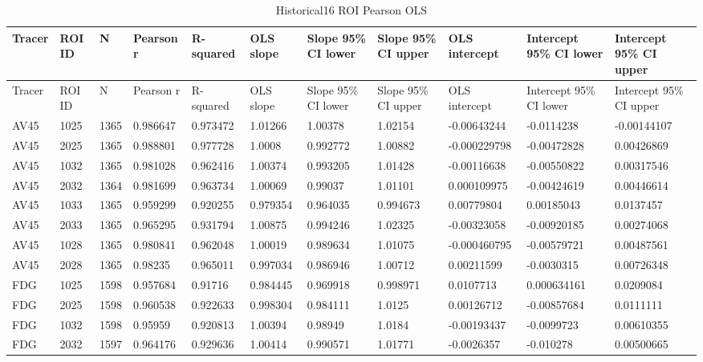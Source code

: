 \begin{landscape}
\begingroup
\footnotesize
\setlength{\tabcolsep}{4pt}
\begin{longtable}{lllllllllll}
\caption{Historical16 ROI Pearson OLS}\label{tab:s-n09}\\
\toprule
Tracer & ROI ID & N & Pearson r & R-squared & OLS slope & Slope 95\% CI lower & Slope 95\% CI upper & OLS intercept & Intercept 95\% CI lower & Intercept 95\% CI upper \\
\midrule
\endfirsthead
\toprule
Tracer & ROI ID & N & Pearson r & R-squared & OLS slope & Slope 95\% CI lower & Slope 95\% CI upper & OLS intercept & Intercept 95\% CI lower & Intercept 95\% CI upper \\
\midrule
\endhead
\bottomrule
\endfoot
AV45 & 1025 & 1365 & 0.986647 & 0.973472 & 1.01266 & 1.00378 & 1.02154 & -0.00643244 & -0.0114238 & -0.00144107 \\
AV45 & 2025 & 1365 & 0.988801 & 0.977728 & 1.0008 & 0.992772 & 1.00882 & -0.000229798 & -0.00472828 & 0.00426869 \\
AV45 & 1032 & 1365 & 0.981028 & 0.962416 & 1.00374 & 0.993205 & 1.01428 & -0.00116638 & -0.00550822 & 0.00317546 \\
AV45 & 2032 & 1364 & 0.981699 & 0.963734 & 1.00069 & 0.99037 & 1.01101 & 0.000109975 & -0.00424619 & 0.00446614 \\
AV45 & 1033 & 1365 & 0.959299 & 0.920255 & 0.979354 & 0.964035 & 0.994673 & 0.00779804 & 0.00185043 & 0.0137457 \\
AV45 & 2033 & 1365 & 0.965295 & 0.931794 & 1.00875 & 0.994246 & 1.02325 & -0.00323058 & -0.00920185 & 0.00274068 \\
AV45 & 1028 & 1365 & 0.980841 & 0.962048 & 1.00019 & 0.989634 & 1.01075 & -0.000460795 & -0.00579721 & 0.00487561 \\
AV45 & 2028 & 1365 & 0.98235 & 0.965011 & 0.997034 & 0.986946 & 1.00712 & 0.00211599 & -0.0030315 & 0.00726348 \\
FDG & 1025 & 1598 & 0.957684 & 0.91716 & 0.984445 & 0.969918 & 0.998971 & 0.0107713 & 0.000634161 & 0.0209084 \\
FDG & 2025 & 1598 & 0.960538 & 0.922633 & 0.998304 & 0.984111 & 1.0125 & 0.00126712 & -0.00857684 & 0.0111111 \\
FDG & 1032 & 1598 & 0.95959 & 0.920813 & 1.00394 & 0.98949 & 1.0184 & -0.00193437 & -0.0099723 & 0.00610355 \\
FDG & 2032 & 1597 & 0.964176 & 0.929636 & 1.00414 & 0.990571 & 1.01771 & -0.0026357 & -0.010278 & 0.00500665 \\

\end{longtable}
\end{landscape}
